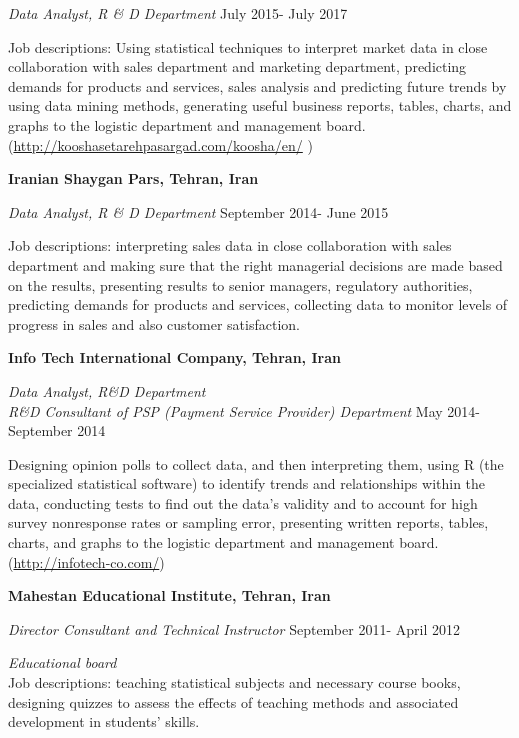 \documentclass[margin,line]{res}
\begin{document}
\begin{resume}
{\em Data Analyst, R \& D Department} \hfill { July 2015- July 2017}

\vspace{-.3cm}
Job descriptions: Using statistical techniques to interpret market data in close collaboration with sales department and marketing department, predicting demands for products and services, sales analysis and predicting future trends by using data mining methods, generating useful business reports, tables, charts, and graphs to the logistic department and management board.({\url{http://kooshasetarehpasargad.com/koosha/en/}} )



{\bf Iranian Shaygan Pars, Tehran, Iran }


{\em Data Analyst, R \& D Department} \hfill {  September 2014- June 2015}

\vspace{-.3cm}
Job descriptions: interpreting sales data in close collaboration with sales department and making sure that the right managerial decisions are made based on the results, presenting results to senior managers, regulatory authorities, predicting demands for products and services, collecting data to monitor levels of progress in sales and also customer satisfaction.

{\bf Info Tech International Company, Tehran, Iran }

{\em Data Analyst, R\&D Department\\ 
	 R\&D Consultant of PSP (Payment Service Provider) Department
} \hfill {  May 2014- September 2014}

\vspace{-.3cm}
Designing opinion polls to collect data, and then interpreting them, using R (the specialized statistical software) to identify trends and relationships within the data, conducting tests to find out the data’s validity and to account for high survey nonresponse rates or sampling error, presenting written reports, tables, charts, and graphs to the logistic department and management board.({\url{http://infotech-co.com/}})


{\bf Mahestan Educational Institute, Tehran, Iran }

{\em Director Consultant and Technical Instructor} \hfill {  September 2011- April 2012 }

\vspace{-.3cm}
{\em Educational board}\\
Job descriptions: teaching statistical subjects and necessary course books, designing quizzes to assess the effects of teaching methods and associated development in students’ skills. 




\end{resume}
\end{document}
